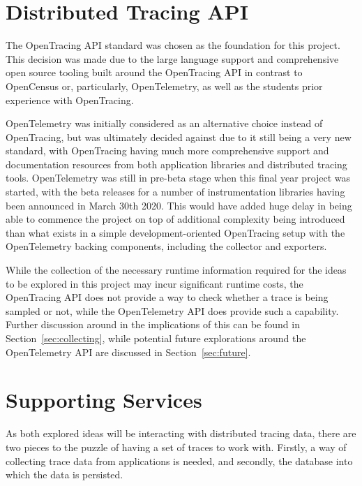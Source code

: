 \documentclass[12pt,pdftex,titlepage]{report}
\begin{document}
        \section{Distributed Tracing API}
            The OpenTracing API standard was chosen as the foundation for this project. This decision was made due to the large language support and comprehensive open
            source tooling built around the OpenTracing API in contrast to OpenCensus or, particularly, OpenTelemetry, as well as the students prior experience with OpenTracing.

            OpenTelemetry was initially considered as an alternative choice instead of OpenTracing, but was ultimately decided against due to it still being a very new
            standard, with OpenTracing having much more comprehensive support and documentation resources from both application libraries and distributed tracing tools.
            OpenTelemetry was still in pre-beta stage when this final year project was started, with the beta releases for a number of instrumentation libraries having been
            announced in March 30th 2020. This would have added huge delay in being able to commence the project on top of additional complexity being introduced than what exists 
            in a simple development-oriented OpenTracing setup with the OpenTelemetry backing components, including the collector and exporters.

            While the collection of the necessary runtime information required for the ideas to be explored in this project may incur significant runtime costs, the OpenTracing API 
            does not provide a way to check whether a trace is being sampled or not, while the OpenTelemetry API does provide such a capability\cite{openteleisrecording}. Further discussion 
            around in the implications of this can be found in Section~\ref{sec:collecting}, while potential future explorations around the OpenTelemetry API are discussed in Section~\ref{sec:future}.

        \section{Supporting Services}
            As both explored ideas will be interacting with distributed tracing data, there are two pieces to the puzzle of having a set of traces to work with.
            Firstly, a way of collecting trace data from applications is needed, and secondly, the database into which the data is persisted.
            
\end{document}
